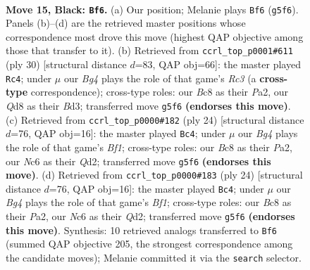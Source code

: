 \documentclass[11pt]{article}
\begin{document}
\clearpage

\begin{figure}[p]\centering
\begin{subfigure}{0.46\textwidth}\centering
\resizebox{\linewidth}{!}{%
\newchessgame
\chessboard[
  setfen={r1bqr1k1/1pp2p1p/2n5/p2p2b1/3P4/N3P1P1/PP3P2/RNBQR1K1 b - - 1 15},
  showmover=false,
  pgfstyle=straightmove, color=movearrow, markmove={g5-f6}
]}
\caption{}
\end{subfigure}\hfill
\begin{subfigure}{0.46\textwidth}\centering
\resizebox{\linewidth}{!}{%
\newchessgame
\chessboard[
  setfen={r1b1k2r/ppqn1pp1/2p1p2p/4P3/7P/2RB1N2/PP2QPP1/5RK1 w kq - 1 16},
  showmover=false,
  pgfstyle=straightmove, color=movearrow, markmove={c3-c4}
]}
\caption{}
\end{subfigure}
\\[4pt]
\begin{subfigure}{0.46\textwidth}\centering
\resizebox{\linewidth}{!}{%
\newchessgame
\chessboard[
  setfen={rn2k2r/1p2b1pp/p2ppn2/6B1/4P3/q1N5/P1PQ2PP/1R2KB1R w Kkq - 0 13},
  showmover=false,
  pgfstyle=straightmove, color=movearrow, markmove={f1-c4}
]}
\caption{}
\end{subfigure}\hfill
\begin{subfigure}{0.46\textwidth}\centering
\resizebox{\linewidth}{!}{%
\newchessgame
\chessboard[
  setfen={rn2k2r/1p2b1pp/p2ppn2/6B1/4P3/q1N5/P1PQ2PP/1R2KB1R w Kkq - 0 13},
  showmover=false,
  pgfstyle=straightmove, color=movearrow, markmove={f1-c4}
]}
\caption{}
\end{subfigure}
\caption{\textbf{Move 15, Black: \texttt{Bf6}.} (a) Our position; Melanie plays \texttt{Bf6} (\texttt{g5f6}). Panels (b)--(d) are the retrieved master positions whose correspondence most drove this move (highest QAP objective among those that transfer to it). (b) Retrieved from \texttt{ccrl\_top\_p0001\#611} (ply 30) [structural distance $d$=83, QAP obj=66]: the master played \texttt{Rc4}; under $\mu$ our \emph{Bg4} plays the role of that game's \emph{Rc3} (a \textbf{cross-type} correspondence); cross-type roles: our \emph{B}c8 as their \emph{P}a2, our \emph{Q}d8 as their \emph{B}d3; transferred move \texttt{g5f6} \textbf{(endorses this move)}. (c) Retrieved from \texttt{ccrl\_top\_p0000\#182} (ply 24) [structural distance $d$=76, QAP obj=16]: the master played \texttt{Bc4}; under $\mu$ our \emph{Bg4} plays the role of that game's \emph{Bf1}; cross-type roles: our \emph{B}c8 as their \emph{P}a2, our \emph{N}c6 as their \emph{Q}d2; transferred move \texttt{g5f6} \textbf{(endorses this move)}. (d) Retrieved from \texttt{ccrl\_top\_p0000\#183} (ply 24) [structural distance $d$=76, QAP obj=16]: the master played \texttt{Bc4}; under $\mu$ our \emph{Bg4} plays the role of that game's \emph{Bf1}; cross-type roles: our \emph{B}c8 as their \emph{P}a2, our \emph{N}c6 as their \emph{Q}d2; transferred move \texttt{g5f6} \textbf{(endorses this move)}. Synthesis: 10 retrieved analogs transferred to \texttt{Bf6} (summed QAP objective 205, the strongest correspondence among the candidate moves); Melanie committed it via the \texttt{search} selector.}
\label{fig:thought-m29}
\end{figure}
\end{document}
